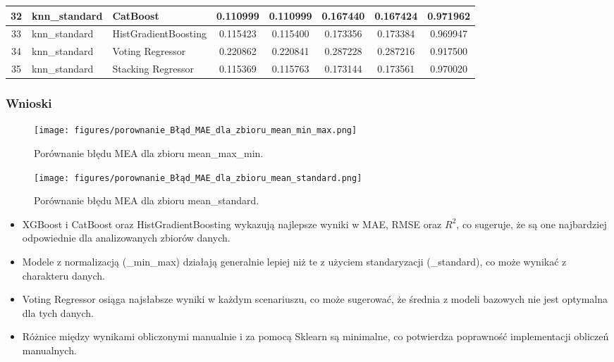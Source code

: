 \documentclass[10pt,letterpaper]{article}
\begin{document}
\begin{landscape}
\begin{table}[H]
\begin{tabular}{|c|l|l|c|c|c|c|c|}
32 & knn\_standard & CatBoost & 0.110999 & 0.110999 & 0.167440 & 0.167424 & 0.971962 \\ \hline
33 & knn\_standard & HistGradientBoosting & 0.115423 & 0.115400 & 0.173356 & 0.173384 & 0.969947 \\ \hline
34 & knn\_standard & Voting Regressor & 0.220862 & 0.220841 & 0.287228 & 0.287216 & 0.917500 \\ \hline
35 & knn\_standard & Stacking Regressor & 0.115369 & 0.115763 & 0.173144 & 0.173561 & 0.970020 \\ \hline
\end{tabular}
\end{table}
\end{landscape}

\newpage
\subsubsection{Wnioski}

\begin{figure}[H]
	\centering
	\texttt{[image: figures/porownanie\_Błąd\_MAE\_dla\_zbioru\_mean\_min\_max.png]}
	\caption{Porównanie błędu MEA dla zbioru mean\_max\_min.}
	\label{fig:mea2}
\end{figure}

\begin{figure}[H]
	\centering
	\texttt{[image: figures/porownanie\_Błąd\_MAE\_dla\_zbioru\_mean\_standard.png]}
	\caption{Porównanie błędu MEA dla zbioru mean\_standard.}
	\label{fig:mea3}
\end{figure}

\newpage
\begin{itemize}
	\item XGBoost i CatBoost oraz HistGradientBoosting wykazują najlepsze wyniki w MAE, RMSE oraz \(R^2\), co sugeruje, że są one najbardziej odpowiednie dla analizowanych zbiorów danych.
	\item Modele z normalizacją (\_min\_max) działają generalnie lepiej niż te z użyciem standaryzacji (\_standard), co może wynikać z charakteru danych.
	\item Voting Regressor osiąga najsłabsze wyniki w każdym scenariuszu, co może sugerować, że średnia z modeli bazowych nie jest optymalna dla tych danych.
	\item Różnice między wynikami obliczonymi manualnie i za pomocą Sklearn są minimalne, co potwierdza poprawność implementacji obliczeń manualnych.
\end{itemize}
\end{document}
